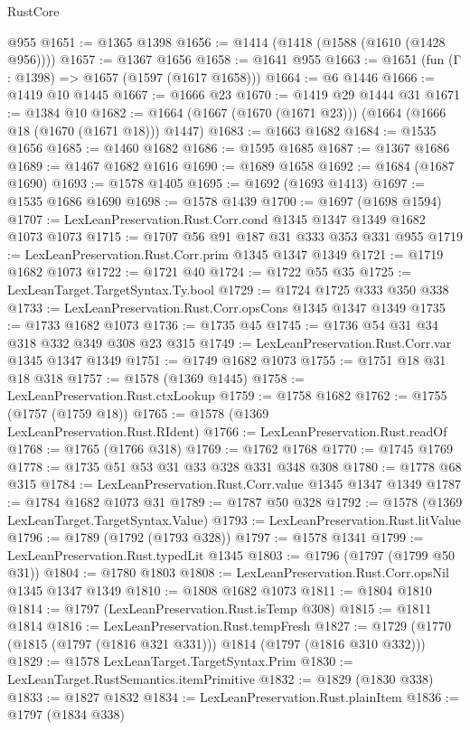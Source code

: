 \begin{lexlean}{RustCore}
\begin{coremodule}
    @955
@1651 := @1365 @1398
@1656 := @1414 (@1418 (@1588 (@1610 (@1428 @956))))
@1657 := @1367 @1656
@1658 := @1641 @955
@1663 := @1651 (fun (Γ : @1398) => @1657 (@1597 (@1617 @1658)))
@1664 := @6 @1446
@1666 := @1419 @10 @1445
@1667 := @1666 @23
@1670 := @1419 @29 @1444 @31
@1671 := @1384 @10
@1682 := @1664 (@1667 (@1670 (@1671 @23))) (@1664 (@1666 @18 (@1670 (@1671 @18))) @1447)
@1683 := @1663 @1682
@1684 := @1535 @1656
@1685 := @1460 @1682
@1686 := @1595 @1685
@1687 := @1367 @1686
@1689 := @1467 @1682 @1616
@1690 := @1689 @1658
@1692 := @1684 (@1687 @1690)
@1693 := @1578 @1405
@1695 := @1692 (@1693 @1413)
@1697 := @1535 @1686 @1690
@1698 := @1578 @1439
@1700 := @1697 (@1698 @1594)
@1707 := LexLeanPreservation.Rust.Corr.cond @1345 @1347 @1349 @1682 @1073 @1073
@1715 := @1707 @56 @91 @187 @31 @333 @353 @331 @955
@1719 := LexLeanPreservation.Rust.Corr.prim @1345 @1347 @1349
@1721 := @1719 @1682 @1073
@1722 := @1721 @40
@1724 := @1722 @55 @35
@1725 := LexLeanTarget.TargetSyntax.Ty.bool
@1729 := @1724 @1725 @333 @350 @338
@1733 := LexLeanPreservation.Rust.Corr.opsCons @1345 @1347 @1349
@1735 := @1733 @1682 @1073
@1736 := @1735 @45
@1745 := @1736 @54 @31 @34 @318 @332 @349 @308 @23 @315
@1749 := LexLeanPreservation.Rust.Corr.var @1345 @1347 @1349
@1751 := @1749 @1682 @1073
@1755 := @1751 @18 @31 @18 @318
@1757 := @1578 (@1369 @1445)
@1758 := LexLeanPreservation.Rust.ctxLookup
@1759 := @1758 @1682
@1762 := @1755 (@1757 (@1759 @18))
@1765 := @1578 (@1369 LexLeanPreservation.Rust.RIdent)
@1766 := LexLeanPreservation.Rust.readOf
@1768 := @1765 (@1766 @318)
@1769 := @1762 @1768
@1770 := @1745 @1769
@1778 := @1735 @51 @53 @31 @33 @328 @331 @348 @308
@1780 := @1778 @68 @315
@1784 := LexLeanPreservation.Rust.Corr.value @1345 @1347 @1349
@1787 := @1784 @1682 @1073 @31
@1789 := @1787 @50 @328
@1792 := @1578 (@1369 LexLeanTarget.TargetSyntax.Value)
@1793 := LexLeanPreservation.Rust.litValue
@1796 := @1789 (@1792 (@1793 @328))
@1797 := @1578 @1341
@1799 := LexLeanPreservation.Rust.typedLit @1345
@1803 := @1796 (@1797 (@1799 @50 @31))
@1804 := @1780 @1803
@1808 := LexLeanPreservation.Rust.Corr.opsNil @1345 @1347 @1349
@1810 := @1808 @1682 @1073
@1811 := @1804 @1810
@1814 := @1797 (LexLeanPreservation.Rust.isTemp @308)
@1815 := @1811 @1814
@1816 := LexLeanPreservation.Rust.tempFresh
@1827 := @1729 (@1770 (@1815 (@1797 (@1816 @321 @331))) @1814 (@1797 (@1816 @310 @332)))
@1829 := @1578 LexLeanTarget.TargetSyntax.Prim
@1830 := LexLeanTarget.RustSemantics.itemPrimitive
@1832 := @1829 (@1830 @338)
@1833 := @1827 @1832
@1834 := LexLeanPreservation.Rust.plainItem
@1836 := @1797 (@1834 @338)

\end{coremodule}
\end{lexlean}
